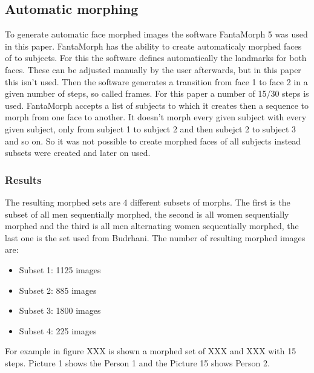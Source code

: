 \subsection{Automatic morphing}
\label{automatic_morph}
To generate automatic face morphed images the software FantaMorph 5 was used in this paper. FantaMorph has the ability to create automaticaly morphed faces of to subjects. For this the software defines automatically the landmarks for both faces. These can be adjusted manually by the user afterwards, but in this paper this isn't used. Then the software generates a transition from face 1 to face 2 in a given number of steps, so called frames. For this paper a number of 15/30 steps is used. FantaMorph accepts a list of subjects to which it creates then a sequence to morph from one face to another. It doesn't morph every given subject with every given subject, only from subject 1 to subject 2 and then subejct 2 to subject 3 and so on. So it was not possible to create morphed faces of all subjects instead subsets were created and later on used.

\subsubsection{Results}
The resulting morphed sets are 4 different subsets of morphs. The first is the subset of all men sequentially morphed, the second is all women sequentially morphed and the third is all men alternating women sequentially morphed, the last one is the set used from Budrhani.
The number of resulting morphed images are:
\begin{itemize}
	\item Subset 1: 1125 images
	\item Subset 2: 885 images
	\item Subset 3: 1800 images
	\item Subset 4: 225 images
\end{itemize}
For example in figure XXX is shown a morphed set of XXX and XXX with 15 steps. Picture 1 shows the Person 1 and the Picture 15 shows Person 2.


